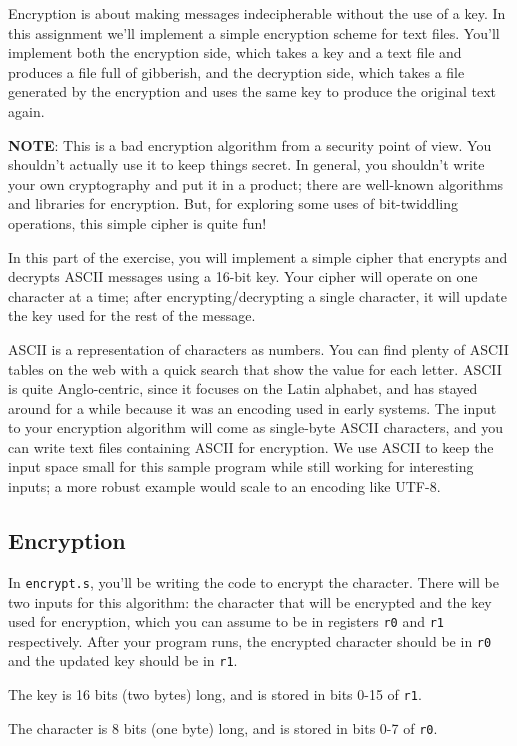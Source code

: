 \documentclass{article}
\def\r#1{\texttt{r#1}}
\begin{document}
Encryption is about making messages indecipherable without the use of a key.
In this assignment we'll implement a simple encryption scheme for text files.
You'll implement both the encryption side, which takes a key and a text file
and produces a file full of gibberish, and the decryption side, which takes a
file generated by the encryption and uses the same key to produce the original
text again.

\textbf{NOTE}: This is a bad encryption algorithm from a security point of
view. You shouldn't actually use it to keep things secret. In general, you
shouldn't write your own cryptography and put it in a product; there are
well-known algorithms and libraries for encryption. But, for exploring some
uses of bit-twiddling operations, this simple cipher is quite fun!

In this part of the exercise, you will implement a simple cipher that
encrypts and decrypts ASCII messages using a 16-bit key. Your cipher
will operate on one character at a time; after encrypting/decrypting a
single character, it will update the key used for the rest of the
message.

ASCII is a representation of characters as numbers. You can find plenty of
ASCII tables on the web with a quick search that show the value for each
letter. ASCII is quite Anglo-centric, since it focuses on the Latin alphabet,
and has stayed around for a while because it was an encoding used in early
systems. The input to your encryption algorithm will come as single-byte ASCII
characters, and you can write text files containing ASCII for encryption. We
use ASCII to keep the input space small for this sample program while still
working for interesting inputs; a more robust example would scale to an
encoding like UTF-8.

\subsection{Encryption}

In \texttt{encrypt.s}, you'll be writing the code to encrypt the character.
There will be two inputs for this algorithm: the character that will be 
encrypted and the key used for encryption, which you can assume to be 
in registers \r{0} and \r{1} respectively. After your program runs, the 
encrypted character should be in \r{0} and the updated key should be in \r{1}.

The key is 16 bits (two bytes) long, and is stored in bits 0-15 of \r{1}.

The character is 8 bits (one byte) long, and is stored in bits 0-7 of \r{0}.
\end{document}
